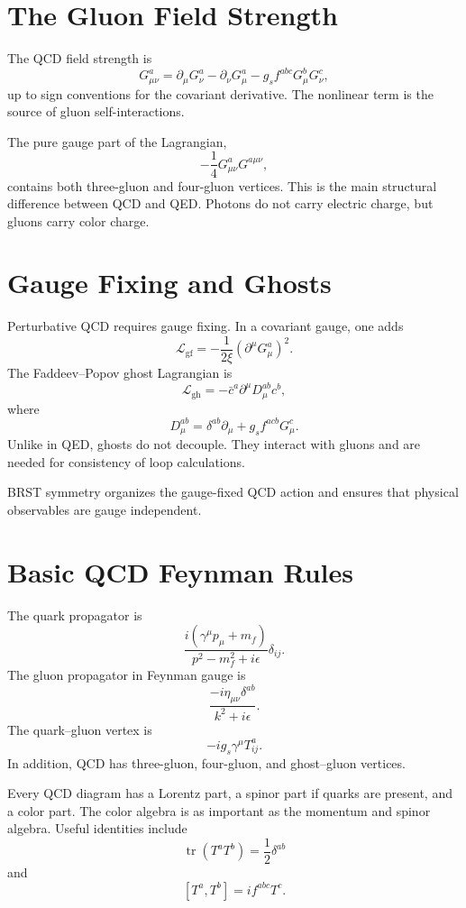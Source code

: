 \section{The Gluon Field Strength}

The QCD field strength is
\[
    G_{\mu\nu}^a
    = \partial_\mu G_\nu^a-\partial_\nu G_\mu^a
      -g_s f^{abc}G_\mu^bG_\nu^c,
\]
up to sign conventions for the covariant derivative. The nonlinear term is the
source of gluon self-interactions.

The pure gauge part of the Lagrangian,
\[
    -\frac{1}{4}G_{\mu\nu}^aG^{a\mu\nu},
\]
contains both three-gluon and four-gluon vertices. This is the main structural
difference between QCD and QED. Photons do not carry electric charge, but gluons
carry color charge.

\section{Gauge Fixing and Ghosts}

Perturbative QCD requires gauge fixing. In a covariant gauge, one adds
\[
    \mathcal{L}_{\mathrm{gf}}
    = -\frac{1}{2\xi}(\partial^\mu G_\mu^a)^2.
\]
The Faddeev--Popov ghost Lagrangian is
\[
    \mathcal{L}_{\mathrm{gh}}
    = -\bar c^a\partial^\mu D_\mu^{ab}c^b,
\]
where
\[
    D_\mu^{ab}=\delta^{ab}\partial_\mu+g_s f^{acb}G_\mu^c.
\]
Unlike in QED, ghosts do not decouple. They interact with gluons and are needed
for consistency of loop calculations.

BRST symmetry organizes the gauge-fixed QCD action and ensures that physical
observables are gauge independent.

\section{Basic QCD Feynman Rules}

The quark propagator is
\[
    \frac{i(\gamma^\mu p_\mu+m_f)}{p^2-m_f^2+i\epsilon}\delta_{ij}.
\]
The gluon propagator in Feynman gauge is
\[
    \frac{-i\eta_{\mu\nu}\delta^{ab}}{k^2+i\epsilon}.
\]
The quark--gluon vertex is
\[
    -ig_s\gamma^\mu T^a_{ij}.
\]
In addition, QCD has three-gluon, four-gluon, and ghost--gluon vertices.

Every QCD diagram has a Lorentz part, a spinor part if quarks are present, and a
color part. The color algebra is as important as the momentum and spinor algebra.
Useful identities include
\[
    \operatorname{tr}(T^aT^b)=\frac{1}{2}\delta^{ab}
\]
and
\[
    [T^a,T^b]=if^{abc}T^c.
\]

